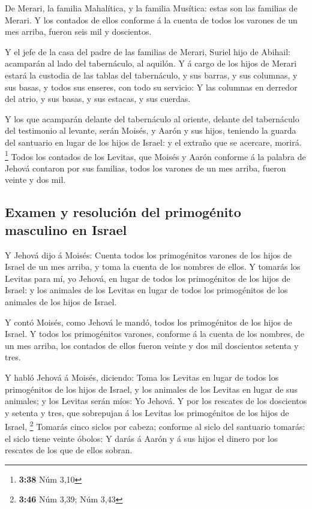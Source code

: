  De Merari, la familia Mahalítica, y la familia Musítica:
estas son las familias de Merari.  Y los contados de ellos
conforme á la cuenta de todos los varones de un mes arriba, fueron seis
mil y doscientos.

 Y el jefe de la casa del padre de las familias de Merari,
Suriel hijo de Abihail: acamparán al lado del tabernáculo, al aquilón.
 Y á cargo de los hijos de Merari estará la custodia de las
tablas del tabernáculo, y sus barras, y sus columnas, y sus basas, y
todos sus enseres, con todo su servicio:  Y las columnas en
derredor del atrio, y sus basas, y sus estacas, y sus cuerdas.

 Y los que acamparán delante del tabernáculo al oriente,
delante del tabernáculo del testimonio al levante, serán Moisés, y Aarón
y sus hijos, teniendo la guarda del santuario en lugar de los hijos de
Israel: y el extraño que se acercare, morirá. \footnote{\textbf{3:38}
  Núm 3,10}  Todos los contados de los Levitas, que Moisés
y Aarón conforme á la palabra de Jehová contaron por sus familias, todos
los varones de un mes arriba, fueron veinte y dos mil.

\hypertarget{examen-y-resoluciuxf3n-del-primoguxe9nito-masculino-en-israel}{%
\subsection{Examen y resolución del primogénito masculino en
Israel}\label{examen-y-resoluciuxf3n-del-primoguxe9nito-masculino-en-israel}}

 Y Jehová dijo á Moisés: Cuenta todos los primogénitos
varones de los hijos de Israel de un mes arriba, y toma la cuenta de los
nombres de ellos.  Y tomarás los Levitas para mí, yo
Jehová, en lugar de todos los primogénitos de los hijos de Israel: y los
animales de los Levitas en lugar de todos los primogénitos de los
animales de los hijos de Israel.

 Y contó Moisés, como Jehová le mandó, todos los
primogénitos de los hijos de Israel.  Y todos los
primogénitos varones, conforme á la cuenta de los nombres, de un mes
arriba, los contados de ellos fueron veinte y dos mil doscientos setenta
y tres.

 Y habló Jehová á Moisés, diciendo:  Toma los
Levitas en lugar de todos los primogénitos de los hijos de Israel, y los
animales de los Levitas en lugar de sus animales; y los Levitas serán
míos: Yo Jehová.  Y por los rescates de los doscientos y
setenta y tres, que sobrepujan á los Levitas los primogénitos de los
hijos de Israel, \footnote{\textbf{3:46} Núm 3,39; Núm 3,43}
 Tomarás cinco siclos por cabeza; conforme al siclo del
santuario tomarás: el siclo tiene veinte óbolos:  Y darás á
Aarón y á sus hijos el dinero por los rescates de los que de ellos
sobran.

